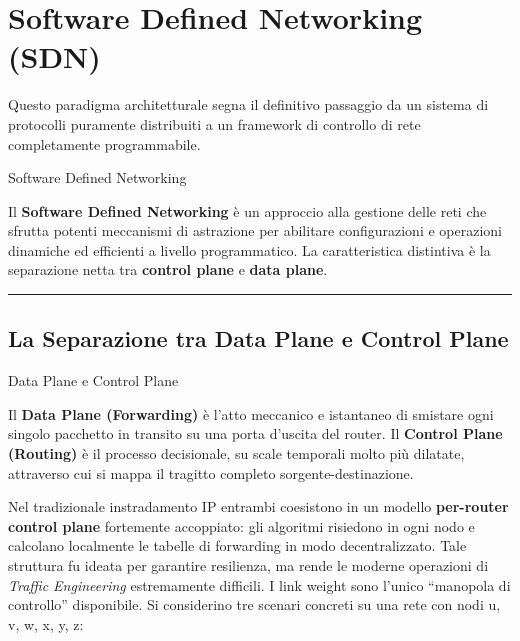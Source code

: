 \documentclass[
  italian,
  openany]{book}
\begin{document}
\newpage

\chapter{Software Defined Networking
(SDN)}\label{software-defined-networking-sdn}

Questo paradigma architetturale segna il definitivo passaggio da un
sistema di protocolli puramente distribuiti a un framework di controllo
di rete completamente programmabile.

\begin{calloutdefinition}{Software Defined Networking}

Il \textbf{Software Defined Networking} è un approccio alla gestione
delle reti che sfrutta potenti meccanismi di astrazione per abilitare
configurazioni e operazioni dinamiche ed efficienti a livello
programmatico. La caratteristica distintiva è la separazione netta tra
\textbf{control plane} e \textbf{data plane}.

\end{calloutdefinition}

\begin{center}\rule{0.5\linewidth}{0.5pt}\end{center}

\section{La Separazione tra Data Plane e Control
Plane}\label{la-separazione-tra-data-plane-e-control-plane}

\begin{calloutdefinition}{Data Plane e Control Plane}

Il \textbf{Data Plane (Forwarding)} è l'atto meccanico e istantaneo di
smistare ogni singolo pacchetto in transito su una porta d'uscita del
router. Il \textbf{Control Plane (Routing)} è il processo decisionale,
su scale temporali molto più dilatate, attraverso cui si mappa il
tragitto completo sorgente-destinazione.

\end{calloutdefinition}

Nel tradizionale instradamento IP entrambi coesistono in un modello
\textbf{per-router control plane} fortemente accoppiato: gli algoritmi
risiedono in ogni nodo e calcolano localmente le tabelle di forwarding
in modo decentralizzato. Tale struttura fu ideata per garantire
resilienza, ma rende le moderne operazioni di \emph{Traffic Engineering}
estremamente difficili. I link weight sono l'unico ``manopola di
controllo'' disponibile. Si considerino tre scenari concreti su una rete
con nodi u, v, w, x, y, z:
\end{document}

